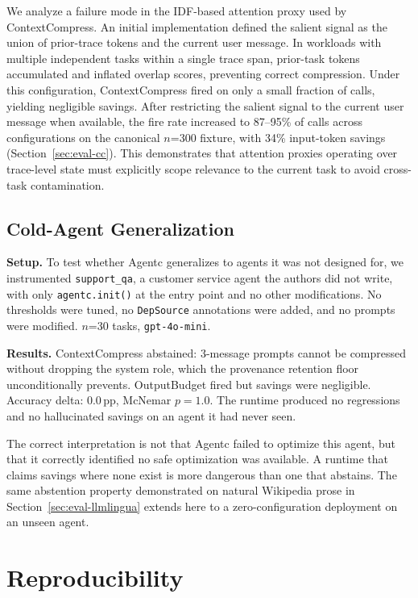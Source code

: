 \documentclass[sigconf,9pt]{acmart}
\begin{document}
We analyze a failure mode in the IDF-based attention proxy used by ContextCompress.
An initial implementation defined the salient signal as the union of prior-trace
tokens and the current user message. In workloads with multiple independent tasks
within a single trace span, prior-task tokens accumulated and inflated overlap scores,
preventing correct compression. Under this configuration, ContextCompress fired on
only a small fraction of calls, yielding negligible savings. After restricting the
salient signal to the current user message when available, the fire rate increased
to 87--95\% of calls across configurations on the canonical $n$=300 fixture, with
34\% input-token savings (Section~\ref{sec:eval-cc}). This demonstrates that
attention proxies operating over trace-level state must explicitly scope relevance to
the current task to avoid cross-task contamination.

\subsection{Cold-Agent Generalization}
\label{sec:eval-coldagent}

\textbf{Setup.} To test whether Agentc generalizes to agents it was not designed for,
we instrumented \texttt{support\_qa}, a customer service agent the authors did not
write, with only \texttt{agentc.init()} at the entry point and no other modifications.
No thresholds were tuned, no \texttt{DepSource} annotations were added, and no prompts
were modified. $n$=30 tasks, \texttt{gpt-4o-mini}.

\textbf{Results.} ContextCompress abstained: 3-message prompts cannot be compressed
without dropping the system role, which the provenance retention floor unconditionally
prevents. OutputBudget fired but savings were negligible. Accuracy delta: 0.0\,pp,
McNemar $p=1.0$. The runtime produced no regressions and no hallucinated savings on
an agent it had never seen.

The correct interpretation is not that Agentc failed to optimize this agent, but that
it correctly identified no safe optimization was available. A runtime that claims
savings where none exist is more dangerous than one that abstains. The same abstention
property demonstrated on natural Wikipedia prose in
Section~\ref{sec:eval-llmlingua} extends here to a zero-configuration deployment on
an unseen agent.


\section{Reproducibility}
\label{sec:repro}
\end{document}
